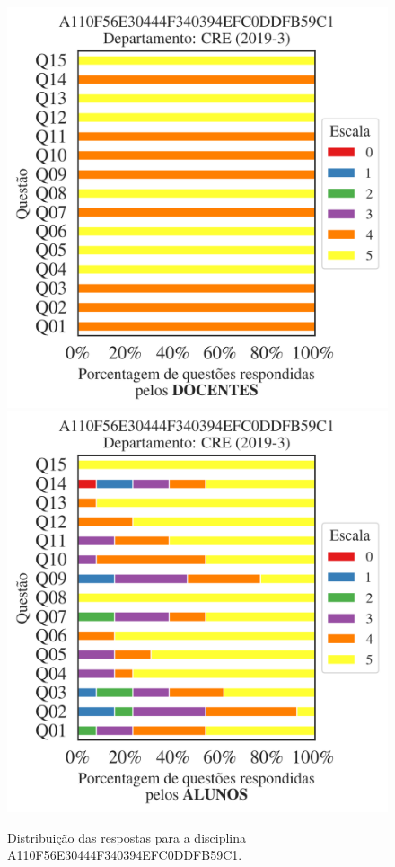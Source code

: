 \documentclass[a4paper,10pt]{article}
\begin{document}
\begin{figure}[h]
\centering
\includegraphics[width=0.485\linewidth]{analise_disciplina_departamento_CRE_A110F56E30444F340394EFC0DDFB59C1_docentes.png}
\includegraphics[width=0.485\linewidth]{analise_disciplina_departamento_CRE_A110F56E30444F340394EFC0DDFB59C1_alunos.png}
\caption{\label{fig:analise_geral_departamento}                Distribuição das respostas para a disciplina A110F56E30444F340394EFC0DDFB59C1. }
\end{figure}
\end{document}
